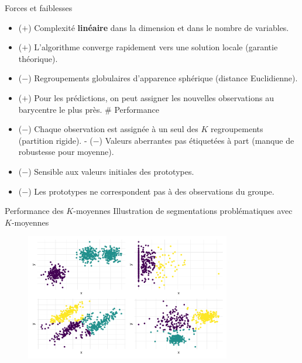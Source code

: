 \documentclass[
  ignorenonframetext,
]{beamer}
\begin{document}
\begin{frame}{Forces et faiblesses}
\protect\hypertarget{forces-et-faiblesses}{}
\begin{itemize}
\item
  (\(+\)) Complexité \textbf{linéaire} dans la dimension et dans le
  nombre de variables.
\item
  (\(+\)) L'algorithme converge rapidement vers une solution locale
  (garantie théorique).
\item
  (\(-\)) Regroupements globulaires d'apparence sphérique (distance
  Euclidienne).
\item
  (\(+\)) Pour les prédictions, on peut assigner les nouvelles
  observations au barycentre le plus près. \# Performance
\item
  (\(-\)) Chaque observation est assignée à un seul des \(K\)
  regroupements (partition rigide). - (\(-\)) Valeurs aberrantes pas
  étiquetées à part (manque de robustesse pour moyenne).
\item
  (\(-\)) Sensible aux valeurs initiales des prototypes.
\item
  (\(-\)) Les prototypes ne correspondent pas à des observations du
  groupe.
\end{itemize}
\end{frame}

\begin{frame}{Performance des \(K\)-moyennes}
\protect\hypertarget{performance-des-k-moyennes}{}
Illustration de segmentations problématiques avec \(K\)-moyennes

\begin{figure}

{\centering \includegraphics[width=0.8\textwidth,height=\textheight]{MATH60602-diapos11_files/figure-beamer/kmoyperfo-1.pdf}

}

\end{figure}
\end{frame}
\end{document}
